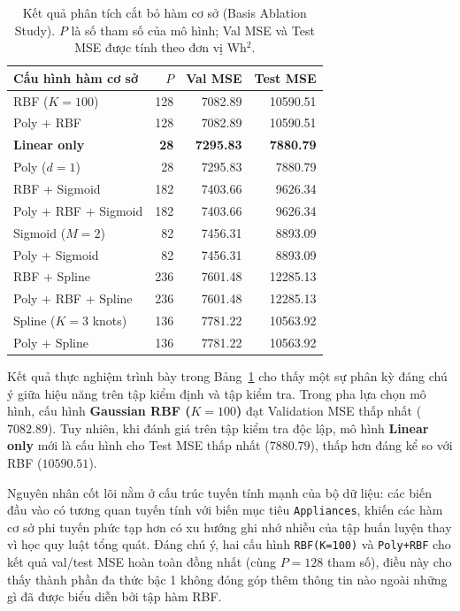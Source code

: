 \begin{table}[H]
    \centering
    \caption{Kết quả phân tích cắt bỏ hàm cơ sở (Basis Ablation Study). 
             $P$ là số tham số của mô hình; Val MSE và Test MSE được tính 
             theo đơn vị Wh$^2$.}
    \label{tab:basis_ablation}
    \renewcommand{\arraystretch}{1.3}
    \begin{tabular}{|l|r|r|r|}
        \hline
        \textbf{Cấu hình hàm cơ sở} & \textbf{$P$} & \textbf{Val MSE} & \textbf{Test MSE} \\
        \hline
        RBF ($K=100$)            & 128 & 7082.89  & 10590.51 \\
        Poly + RBF               & 128 & 7082.89  & 10590.51 \\
        \textbf{Linear only}     & \textbf{28}  & \textbf{7295.83}  & \textbf{7880.79}  \\
        Poly ($d=1$)             & 28  & 7295.83  & 7880.79  \\
        RBF + Sigmoid            & 182 & 7403.66  & 9626.34  \\
        Poly + RBF + Sigmoid     & 182 & 7403.66  & 9626.34  \\
        Sigmoid ($M=2$)          & 82  & 7456.31  & 8893.09  \\
        Poly + Sigmoid           & 82  & 7456.31  & 8893.09  \\
        RBF + Spline             & 236 & 7601.48  & 12285.13 \\
        Poly + RBF + Spline      & 236 & 7601.48  & 12285.13 \\
        Spline ($K=3$ knots)     & 136 & 7781.22  & 10563.92 \\
        Poly + Spline            & 136 & 7781.22  & 10563.92 \\
        \hline
    \end{tabular}
\end{table}
Kết quả thực nghiệm trình bày trong Bảng~\ref{tab:basis_ablation} cho thấy một sự phân kỳ đáng chú ý 
giữa hiệu năng trên tập kiểm định và tập kiểm tra. Trong pha lựa chọn mô hình, cấu hình 
\textbf{Gaussian RBF ($K=100$)} đạt Validation MSE thấp nhất ($7082.89$). Tuy nhiên, khi đánh giá 
trên tập kiểm tra độc lập, mô hình \textbf{Linear only} mới là cấu hình 
cho Test MSE thấp nhất ($7880.79$), thấp hơn đáng kể so với RBF ($10590.51$).

Nguyên nhân cốt lõi nằm ở cấu trúc tuyến tính mạnh của bộ dữ liệu: các biến đầu vào có 
tương quan tuyến tính với biến mục tiêu \texttt{Appliances}, khiến các hàm cơ sở phi tuyến phức 
tạp hơn có xu hướng ghi nhớ nhiễu của tập huấn luyện thay vì học quy luật tổng quát. 
Đáng chú ý, hai cấu hình \texttt{RBF(K=100)} và \texttt{Poly+RBF} cho kết quả val/test MSE 
hoàn toàn đồng nhất (cùng $P=128$ tham số), điều này cho thấy thành phần đa thức bậc 1 
không đóng góp thêm thông tin nào ngoài những gì đã được biểu diễn bởi tập hàm RBF.


